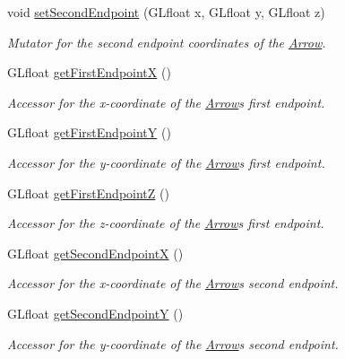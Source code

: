\begin{DoxyCompactItemize}
void \hyperlink{classtsgl_1_1_arrow_a40040ab8b8cd21631f05ce1158bd2737}{set\+Second\+Endpoint} (G\+Lfloat x, G\+Lfloat y, G\+Lfloat z)
\begin{DoxyCompactList}\small\item\em Mutator for the second endpoint coordinates of the \hyperlink{classtsgl_1_1_arrow}{Arrow}. \end{DoxyCompactList}\item 
G\+Lfloat \hyperlink{classtsgl_1_1_arrow_a56f3590dcd62f465958f8b8e103dac4f}{get\+First\+EndpointX} ()
\begin{DoxyCompactList}\small\item\em Accessor for the x-\/coordinate of the \hyperlink{classtsgl_1_1_arrow}{Arrow}\textquotesingle{}s first endpoint. \end{DoxyCompactList}\item 
G\+Lfloat \hyperlink{classtsgl_1_1_arrow_ad83e321d535001bb4172b3009ff82f19}{get\+First\+EndpointY} ()
\begin{DoxyCompactList}\small\item\em Accessor for the y-\/coordinate of the \hyperlink{classtsgl_1_1_arrow}{Arrow}\textquotesingle{}s first endpoint. \end{DoxyCompactList}\item 
G\+Lfloat \hyperlink{classtsgl_1_1_arrow_aed21293d711501354026d26615146d03}{get\+First\+EndpointZ} ()
\begin{DoxyCompactList}\small\item\em Accessor for the z-\/coordinate of the \hyperlink{classtsgl_1_1_arrow}{Arrow}\textquotesingle{}s first endpoint. \end{DoxyCompactList}\item 
G\+Lfloat \hyperlink{classtsgl_1_1_arrow_aa17e6bfe5f41e5a13a8378b1819f108d}{get\+Second\+EndpointX} ()
\begin{DoxyCompactList}\small\item\em Accessor for the x-\/coordinate of the \hyperlink{classtsgl_1_1_arrow}{Arrow}\textquotesingle{}s second endpoint. \end{DoxyCompactList}\item 
G\+Lfloat \hyperlink{classtsgl_1_1_arrow_a512407b73d07ca147c6a94ff933922f7}{get\+Second\+EndpointY} ()
\begin{DoxyCompactList}\small\item\em Accessor for the y-\/coordinate of the \hyperlink{classtsgl_1_1_arrow}{Arrow}\textquotesingle{}s second endpoint. \end{DoxyCompactList}\item 

\end{DoxyCompactItemize}

